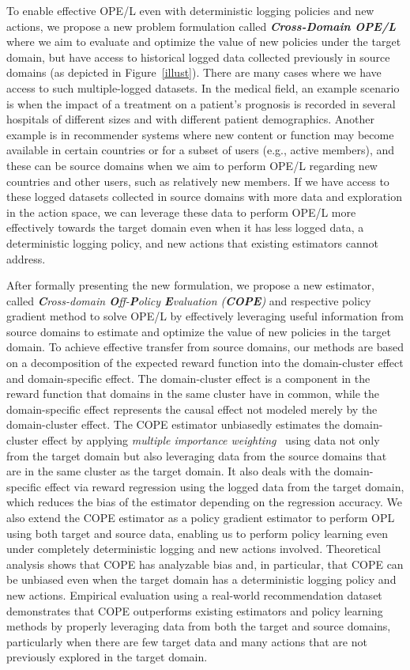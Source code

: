 \documentclass{article} %
\theoremstyle{definition}
\begin{document}
To enable effective OPE/L even with deterministic logging policies and new actions, we propose a new problem formulation called\textbf{ \textit{Cross-Domain OPE/L}} where we aim to evaluate and optimize the value of new policies under the target domain, but have access to historical logged data collected previously in source domains (as depicted in Figure~\ref{illust}). There are many cases where we have access to such multiple-logged datasets. In the medical field, an example scenario is when the impact of a treatment on a patient's prognosis is recorded in several hospitals of different sizes and with different patient demographics. Another example is in recommender systems where new content or function may become available in certain countries or for a subset of users (e.g., active members), and these can be source domains when we aim to perform OPE/L regarding new countries and other users, such as relatively new members. If we have access to these logged datasets collected in source domains with more data and exploration in the action space, we can leverage these data to perform OPE/L more effectively towards the target domain even when it has less logged data, a deterministic logging policy, and new actions that existing estimators cannot address.

After formally presenting the new formulation, we propose a new estimator, called \textit{\textbf{C}ross-domain \textbf{O}ff-\textbf{P}olicy \textbf{E}valuation (\textbf{COPE})} and respective policy gradient method to solve OPE/L by effectively leveraging useful information from source domains to estimate and optimize the value of new policies in the target domain. To achieve effective transfer from source domains, our methods are based on a decomposition of the expected reward function into the domain-cluster effect and domain-specific effect. The domain-cluster effect is a component in the reward function that domains in the same cluster have in common, while the domain-specific effect represents the causal effect not modeled merely by the domain-cluster effect. The COPE estimator unbiasedly estimates the domain-cluster effect by applying \textit{multiple importance weighting}~\citep{owen2013monte,agarwal2017effective} using data not only from the target domain but also leveraging data from the source domains that are in the same cluster as the target domain. It also deals with the domain-specific effect via reward regression using the logged data from the target domain, which reduces the bias of the estimator depending on the regression accuracy. We also extend the COPE estimator as a policy gradient estimator to perform OPL using both target and source data, enabling us to perform policy learning even under completely deterministic logging and new actions involved. Theoretical analysis shows that COPE has analyzable bias and, in particular, that COPE can be unbiased even when the target domain has a deterministic logging policy and new actions. Empirical evaluation using a real-world recommendation dataset demonstrates that COPE outperforms existing estimators and policy learning methods by properly leveraging data from both the target and source domains, particularly when there are few target data and many actions that are not previously explored in the target domain.
\end{document}
